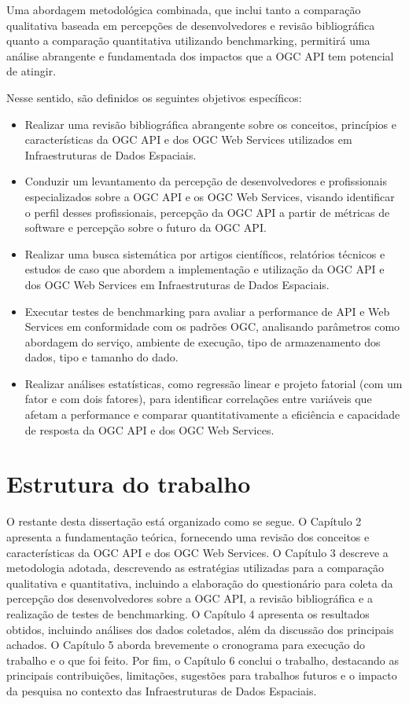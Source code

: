 Uma abordagem metodológica combinada, que inclui tanto a comparação qualitativa baseada em percepções de desenvolvedores e revisão bibliográfica quanto a comparação quantitativa utilizando benchmarking, permitirá uma análise abrangente e fundamentada dos impactos que a OGC API tem potencial de atingir.

Nesse sentido, são definidos os seguintes objetivos específicos:

\begin{itemize}
    \item Realizar uma revisão bibliográfica abrangente sobre os conceitos, princípios e características da OGC API e dos OGC Web Services utilizados em Infraestruturas de Dados Espaciais.
    \item Conduzir um levantamento da percepção de desenvolvedores e profissionais especializados sobre a OGC API e os OGC Web Services, visando identificar o perfil desses profissionais, percepção da OGC API a partir de métricas de software e percepção sobre o futuro da OGC API.
    \item Realizar uma busca sistemática por artigos científicos, relatórios técnicos e estudos de caso que abordem a implementação e utilização da OGC API e dos OGC Web Services em Infraestruturas de Dados Espaciais.
    \item Executar testes de benchmarking para avaliar a performance de API e Web Services em conformidade com os padrões OGC, analisando parâmetros como abordagem do serviço, ambiente de execução, tipo de armazenamento dos dados, tipo e tamanho do dado.
    \item Realizar análises estatísticas, como regressão linear e projeto fatorial (com um fator e com dois fatores), para identificar correlações entre variáveis que afetam a performance e comparar quantitativamente a eficiência e capacidade de resposta da OGC API e dos OGC Web Services.
\end{itemize}

\section{Estrutura do trabalho}

O restante desta dissertação está organizado como se segue. O Capítulo 2 apresenta a fundamentação teórica, fornecendo uma revisão dos conceitos e características da OGC API e dos OGC Web Services. O Capítulo 3 descreve a metodologia adotada, descrevendo as estratégias utilizadas para a comparação qualitativa e quantitativa, incluindo a elaboração do questionário para coleta da percepção dos desenvolvedores sobre a OGC API, a revisão bibliográfica e a realização de testes de benchmarking. O Capítulo 4 apresenta os resultados obtidos, incluindo análises dos dados coletados, além da discussão dos principais achados. O Capítulo 5 aborda brevemente o cronograma para execução do trabalho e o que foi feito. Por fim, o Capítulo 6 conclui o trabalho, destacando as principais contribuições, limitações, sugestões para trabalhos futuros e o impacto da pesquisa no contexto das Infraestruturas de Dados Espaciais.